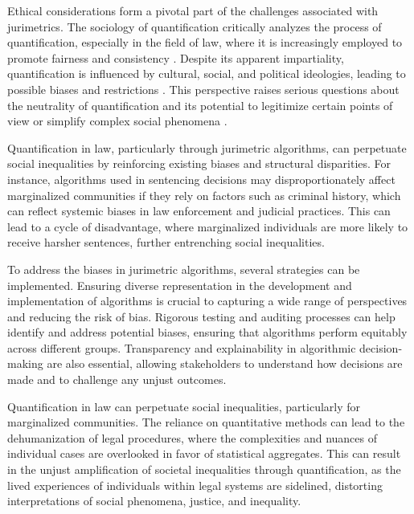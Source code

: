 Ethical considerations form a pivotal part of the challenges associated with jurimetrics. The sociology of quantification critically analyzes the process of quantification, especially in the field of law, where it is increasingly employed to promote fairness and consistency \cite{10.1057/s41599-020-00557-0,de2010jurimetrics}. Despite its apparent impartiality, quantification is influenced by cultural, social, and political ideologies, leading to possible biases and restrictions \cite{10.1177/09596801221075807,de2010jurimetrics}. This perspective raises serious questions about the neutrality of quantification and its potential to legitimize certain points of view or simplify complex social phenomena \cite{10.1111/ilr.12067,de2010jurimetrics}.

Quantification in law, particularly through jurimetric algorithms, can perpetuate social inequalities by reinforcing existing biases and structural disparities. For instance, algorithms used in sentencing decisions may disproportionately affect marginalized communities if they rely on factors such as criminal history, which can reflect systemic biases in law enforcement and judicial practices. This can lead to a cycle of disadvantage, where marginalized individuals are more likely to receive harsher sentences, further entrenching social inequalities.

To address the biases in jurimetric algorithms, several strategies can be implemented. Ensuring diverse representation in the development and implementation of algorithms is crucial to capturing a wide range of perspectives and reducing the risk of bias. Rigorous testing and auditing processes can help identify and address potential biases, ensuring that algorithms perform equitably across different groups. Transparency and explainability in algorithmic decision-making are also essential, allowing stakeholders to understand how decisions are made and to challenge any unjust outcomes.

Quantification in law can perpetuate social inequalities, particularly for marginalized communities. The reliance on quantitative methods can lead to the dehumanization of legal procedures, where the complexities and nuances of individual cases are overlooked in favor of statistical aggregates. This can result in the unjust amplification of societal inequalities through quantification, as the lived experiences of individuals within legal systems are sidelined, distorting interpretations of social phenomena, justice, and inequality.

